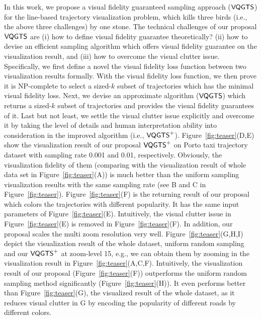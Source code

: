 In this work, we propose a visual fidelity guaranteed sampling approach ($\mathsf{VQGTS}{}$) for the line-based trajectory visualization problem,
which kills three birds (i.e., the above three challenges) by one stone.
The technical challenges of our proposal $\mathsf{VQGTS}{}$ are 
(i) how to define visual fidelity guarantee theoretically?
(ii) how to devise an efficient sampling algorithm which offers visual fidelity guarantee on the visualization result,
and (iii) how to overcome the visual clutter issue.
Specifically, we first define a novel the visual fidelity loss function between two visualization results formally.
With the visual fidelity loss function, we then prove it is NP-complete to select a sized-$k$ subset of trajectories which has the minimal visual fidelity loss.
Next, we devise an approximate algorithm ($\mathsf{VQGTS}$) which returns a sized-$k$ subset of trajectories and provides the visual fidelity guarantees of it.
Last but not least, we settle the visual clutter issue explicitly and overcome it by taking the level of details and human interpretation ability into consideration in the improved algorithm (i.e., $\mathsf{VQGTS}^{+}$).
Figure~\ref{fig:teaser}(D,E) show the visualization result of our proposal $\mathsf{VQGTS}^{+}{}$ on Porto taxi trajectory dataset with sampling rate 0.001 and 0.01, respectively.
Obviously, the visualization fidelity of them (comparing with the visualization result of whole data set in Figure~\ref{fig:teaser}(A)) is much better than 
the uniform sampling visualization results with the same sampling rate  (see B and C in Figure~\ref{fig:teaser}).
Figure~\ref{fig:teaser}(F) is the returning result of our proposal which colors the trajectories with different popularity.
It has the same input parameters of Figure~\ref{fig:teaser}(E). 
Intuitively, the visual clutter issue in Figure~\ref{fig:teaser}(E) is  removed in Figure~\ref{fig:teaser}(F).
In addition, our proposal scales the multi zoom resolution very well.
Figure~\ref{fig:teaser}(G,H,I) depict the visualization result of the whole dataset, uniform random sampling and our $\mathsf{VQGTS}^{+}$ at zoom-level 15,
e.g., we can obtain them by zooming in the visualization result in Figure~\ref{fig:teaser}(A,C,F).
Intuitively, the visualization result of our proposal (Figure~\ref{fig:teaser}(F)) outperforms the uniform random sampling method significantly (Figure~\ref{fig:teaser}(H)).
It even performs better than Figure~\ref{fig:teaser}(G), the visualized result of the whole dataset, as it reduces visual clutter in G by encoding the popularity of different roads by different colors.

